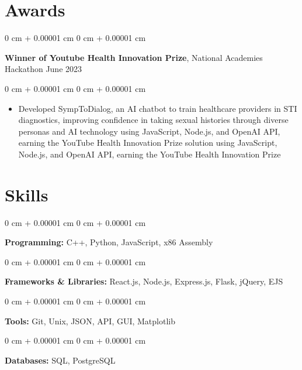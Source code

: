 \documentclass[10pt, letterpaper]{article}
\newenvironment{highlights}{
    \begin{itemize}[
        topsep=0.10 cm,
        parsep=0.10 cm,
        partopsep=0pt,
        itemsep=0pt,
        leftmargin=0 cm + 10pt
    ]
}{
    \end{itemize}
} %
\newenvironment{onecolentry}{
    \begin{adjustwidth}{
        0 cm + 0.00001 cm
    }{
        0 cm + 0.00001 cm
    }
}{
    \end{adjustwidth}
} %
\newenvironment{twocolentry}[2][]{
    \onecolentry
    \def\secondColumn{#2}
    \setcolumnwidth{\fill, 4.5 cm}
    \begin{paracol}{2}
}{
    \switchcolumn \raggedleft \secondColumn
    \end{paracol}
    \endonecolentry
} %
\begin{document}
    
    \section{Awards}



        
        \begin{twocolentry}{
            June 2023
        }
            \textbf{Winner of Youtube Health Innovation Prize}, National Academies Hackathon\end{twocolentry}

        \vspace{0.10 cm}
        \begin{onecolentry}
            \begin{highlights}
                \item Developed SympToDialog, an AI chatbot to train healthcare providers in STI diagnostics, improving confidence in taking sexual histories through diverse personas and AI technology using JavaScript, Node.js, and OpenAI API, earning the YouTube Health Innovation Prize solution using JavaScript, Node.js, and OpenAI API, earning the YouTube Health Innovation Prize
            \end{highlights}
        \end{onecolentry}



    
    \section{Skills}



        
        \begin{onecolentry}
            \textbf{Programming:} C++, Python, JavaScript, x86 Assembly
        \end{onecolentry}

        \vspace{0.2 cm}

        \begin{onecolentry}
            \textbf{Frameworks \& Libraries:} React.js, Node.js, Express.js, Flask, jQuery, EJS
        \end{onecolentry}

        \vspace{0.2 cm}

        \begin{onecolentry}
            \textbf{Tools:} Git, Unix, JSON, API, GUI, Matplotlib
        \end{onecolentry}

        \vspace{0.2 cm}

        \begin{onecolentry}
            \textbf{Databases:} SQL, PostgreSQL
        \end{onecolentry}


    
\end{document}
